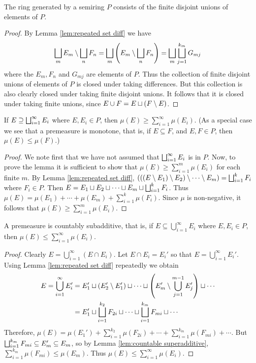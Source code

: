 \begin{corollary}\label{cor:ring generated by semiring}
The ring generated by a semiring $P$ consists of the finite disjoint unions of elements of $P$.
\end{corollary}

\begin{proof}
By Lemma \ref{lem:repeated set diff} we have \[\bigsqcup_mE_m\setminus\bigsqcup_nF_n=\bigsqcup_m\left(E_m\setminus\bigsqcup_nF_n\right)=\bigsqcup_m\bigsqcup_{j=1}^{k_m}G_{mj}\] where the $E_m, F_n$ and $G_{mj}$ are elements of $P$. Thus the collection of finite disjoint unions of elements of $P$ is closed under taking differences. But this collection is also clearly closed under taking finite disjoint unions. It follows that it is closed under taking finite unions, since $E\cup F=E\sqcup(F\setminus E)$.
\end{proof}


\begin{lemma}\label{lem:countable superadditive}
If $E\supseteq\bigsqcup_{i=1}^\infty E_i$ where $E,E_i\in P$, then $\mu(E)\geq\sum_{i=1}^\infty\mu(E_i)$. (As a special case we see that a premeasure is monotone, that is, if $E\subseteq F$, and $E,F\in P$, then $\mu(E)\leq\mu(F)$.)
\end{lemma}

\begin{proof}
We note first that we have not assumed that $\bigsqcup_{i=1}^\infty E_i$ is in $P$. Now, to prove the lemma it is sufficient to show that $\mu(E)\geq\sum_{i=1}^m\mu(E_i)$ for each finite $m$. By Lemma \ref{lem:repeated set diff}, $(((E\setminus E_1)\setminus E_2)\setminus\cdots\setminus E_m)=\bigsqcup_{i=1}^kF_i$ where $F_i\in P$. Then $E=E_1\sqcup E_2\sqcup\cdots\sqcup E_m\sqcup\bigsqcup_{i=1}^kF_i$. Thus $\mu(E)=\mu(E_1)+\cdots+\mu(E_m)+\sum_{i=1}^k\mu(F_i)$. Since $\mu$ is non-negative, it follows that $\mu(E)\geq\sum_{i=1}^m\mu(E_i)$.
\end{proof}

\begin{lemma}
A premeasure is countably subadditive, that is, if $E\subseteq\bigcup_{i=1}^\infty E_i$ where $E,E_i\in P$, then $\mu(E)\leq\sum_{i=1}^\infty\mu(E_i)$.
\end{lemma}

\begin{proof}
Clearly $E=\bigcup_{i=1}^\infty(E\cap E_i)$. Let $E\cap E_i=E_i'$ so that $E=\bigcup_{i=1}^\infty E_i'$. Using Lemma \ref{lem:repeated set diff} repeatedly we obtain 
\begin{align*}
    E=\bigcup_{i=1}^\infty E_i'&=E_1'\sqcup(E_2'\setminus E_1')\sqcup\cdots\sqcup\left(E_m'\setminus\bigcup_{j=1}^{m-1}E_j'\right)\sqcup\cdots\\
    &=E_1'\sqcup\bigsqcup_{i=1}^{k_2}F_{2i}\sqcup\cdots\sqcup\bigsqcup_{i=1}^{k_m} F_{mi}\sqcup\cdots\\
\end{align*}
Therefore, $\mu(E)=\mu(E_1')+\sum_{i=1}^{k_2}\mu(F_{2i})+\cdots+\sum_{i=1}^{k_m}\mu(F_{mi})+\cdots$. But $\bigsqcup_{i=1}^{k_m}F_{mi}\subseteq E_m'\subseteq E_m$, so by Lemma \ref{lem:countable superadditive}, $\sum_{i=1}^{k_m}\mu(F_{mi})\leq\mu(E_m)$. Thus $\mu(E)\leq\sum_{i=1}^\infty\mu(E_i)$.
\end{proof}

